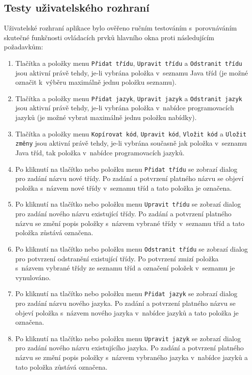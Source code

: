 \documentclass[czech,BP]{thesiskiv}
\begin{document}
\subsection{Testy uživatelského rozhraní}
Uživatelské rozhraní aplikace bylo ověřeno ručním testováním s~porovnáváním skutečné funkčnosti ovládacích prvků hlavního okna proti následujícím požadavkům:
\begin{enumerate}
\item{Tlačítka a položky menu \texttt{Přidat třídu}, \texttt{Upravit třídu} a \texttt{Odstranit třídu} jsou aktivní právě tehdy, je-li vybrána položka v~seznamu Java tříd (je možné označit k~výběru maximálně jednu položku seznamu).}
\item{Tlačítka a položky menu \texttt{Přidat jazyk}, \texttt{Upravit jazyk} a \texttt{Odstranit jazyk} jsou aktivní právě tehdy, je-li vybrána položka v~nabídce programovacích jazyků (je možné vybrat maximálně jednu položku nabídky).}
\item{Tlačítka a položky menu \texttt{Kopírovat kód}, \texttt{Upravit kód}, \texttt{Vložit kód} a \texttt{Uložit změny} jsou aktivní právě tehdy, je-li vybrána současně jak položka v~seznamu Java tříd, tak položka v~nabídce programovacích jazyků.}
\item{Po kliknutí na tlačítko nebo položku menu \texttt{Přidat třídu} se zobrazí dialog pro zadání názvu nové třídy. Po zadání a potvrzení platného názvu se objeví položka s~názvem nové třídy v~seznamu tříd a tato položka je označena.}
\item{Po kliknutí na tlačítko nebo položku menu \texttt{Upravit třídu} se zobrazí dialog pro zadání nového názvu existující třídy. Po zadání a potvrzení platného názvu se změní popis položky s~názvem vybrané třídy v~seznamu tříd a tato položka zůstává označena.}
\item{Po kliknutí na tlačítko nebo položku menu \texttt{Odstranit třídu} se zobrazí dialog pro potvrzení odstranění existující třídy. Po potvrzení zmizí položka s~názvem vybrané třídy ze seznamu tříd a označení položek v~seznamu je vynulováno.}
\item{Po kliknutí na tlačítko nebo položku menu \texttt{Přidat jazyk} se zobrazí dialog pro zadání názvu nového jazyka. Po zadání a potvrzení platného názvu se objeví položka s~názvem nového jazyka v~nabídce jazyků a tato položka je označena.}
\item{Po kliknutí na tlačítko nebo položku menu \texttt{Upravit jazyk} se zobrazí dialog pro zadání nového názvu existujícího jazyka. Po zadání a potvrzení platného názvu se změní popis položky s~názvem vybraného jazyka v~nabídce jazyků a tato položka zůstává označena.}

\end{enumerate}
\end{document}
